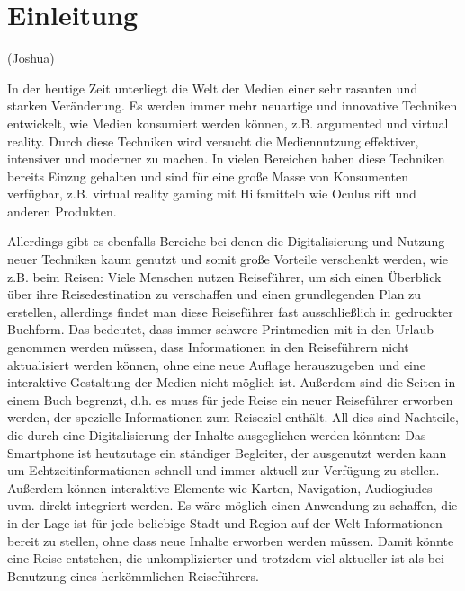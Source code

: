 \chapter{Einleitung}

(Joshua)

In der heutige Zeit unterliegt die Welt der Medien einer sehr rasanten und starken Veränderung. Es werden immer mehr neuartige und innovative Techniken entwickelt, wie Medien konsumiert werden können, z.B. argumented und virtual reality. Durch diese Techniken wird versucht die Mediennutzung effektiver, intensiver und moderner zu machen. In vielen Bereichen haben diese Techniken bereits Einzug gehalten und sind für eine große Masse von Konsumenten verfügbar, z.B. virtual reality gaming mit Hilfsmitteln wie Oculus rift und anderen Produkten.

\vspace{0.25cm}

Allerdings gibt es ebenfalls Bereiche bei denen die Digitalisierung und Nutzung neuer Techniken kaum genutzt und somit große Vorteile verschenkt werden, wie z.B. beim Reisen: Viele Menschen nutzen Reiseführer, um sich einen Überblick über ihre Reisedestination zu verschaffen und einen grundlegenden Plan zu erstellen, allerdings findet man diese Reiseführer fast ausschließlich in gedruckter Buchform. Das bedeutet, dass immer schwere Printmedien mit in den Urlaub genommen werden müssen, dass Informationen in den Reiseführern nicht aktualisiert werden können, ohne eine neue Auflage herauszugeben und eine interaktive Gestaltung der Medien nicht möglich ist. Außerdem sind die Seiten in einem Buch begrenzt, d.h. es muss für jede Reise ein neuer Reiseführer erworben werden, der spezielle Informationen zum Reiseziel enthält. All dies sind Nachteile, die durch eine Digitalisierung der Inhalte ausgeglichen werden könnten: Das Smartphone ist heutzutage ein ständiger Begleiter, der ausgenutzt werden kann um Echtzeitinformationen schnell und immer aktuell zur Verfügung zu stellen. Außerdem können interaktive Elemente wie Karten, Navigation, Audiogiudes uvm. direkt integriert werden. Es wäre möglich einen Anwendung zu schaffen, die in der Lage ist für jede beliebige Stadt und Region auf der Welt Informationen bereit zu stellen, ohne dass neue Inhalte erworben werden müssen. Damit könnte eine Reise entstehen, die unkomplizierter und trotzdem viel aktueller ist als bei Benutzung eines herkömmlichen Reiseführers.

\vspace{0.25cm}

